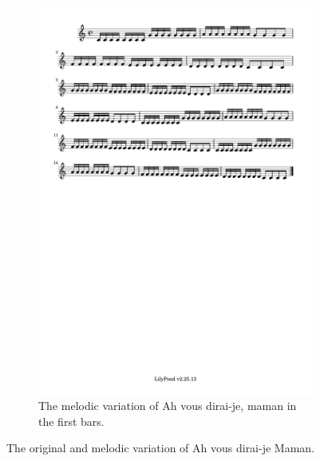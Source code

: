 \documentclass[11pt]{article}
\theoremstyle{definition}
\begin{document}
\begin{figure}
\begin{subfigure}{\textwidth}
\label{fig:MV1} 
\end{subfigure}
\begin{subfigure}{\textwidth}
\centering
\includegraphics[trim=1cm 26.5cm 8.615cm 0.5cm, clip, scale=0.8]{melody_variation.pdf}
\caption{The melodic variation of Ah vous dirai-je, maman in the first bars.}
\label{fig:MV2}
\end{subfigure}
\caption{The original and melodic variation of Ah vous dirai-je Maman.}
\end{figure}
\end{document}
